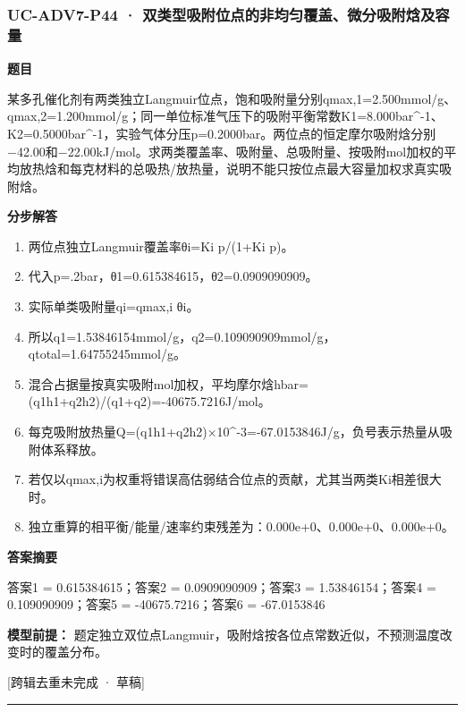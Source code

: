 \documentclass[UTF8,11pt,a4paper]{ctexart}
\begin{document}
\subsubsection*{UC-ADV7-P44 · 双类型吸附位点的非均匀覆盖、微分吸附焓及容量}
\noindent\textbf{题目}\par
某多孔催化剂有两类独立Langmuir位点，饱和吸附量分别qmax,1=2.500mmol/g、qmax,2=1.200mmol/g；同一单位标准气压下的吸附平衡常数K1=8.000bar\textasciicircum{}-1、K2=0.5000bar\textasciicircum{}-1，实验气体分压p=0.2000bar。两位点的恒定摩尔吸附焓分别−42.00和−22.00kJ/mol。求两类覆盖率、吸附量、总吸附量、按吸附mol加权的平均放热焓和每克材料的总吸热/放热量，说明不能只按位点最大容量加权求真实吸附焓。\par
\medskip\noindent\textbf{分步解答}
\begin{enumerate}
\item 两位点独立Langmuir覆盖率θi=Ki p/(1+Ki p)。
\item 代入p=.2bar，θ1=0.615384615，θ2=0.0909090909。
\item 实际单类吸附量qi=qmax,i θi。
\item 所以q1=1.53846154mmol/g，q2=0.109090909mmol/g，qtotal=1.64755245mmol/g。
\item 混合占据量按真实吸附mol加权，平均摩尔焓hbar=(q1h1+q2h2)/(q1+q2)=-40675.7216J/mol。
\item 每克吸附放热量Q=(q1h1+q2h2)×10\textasciicircum{}-3=-67.0153846J/g，负号表示热量从吸附体系释放。
\item 若仅以qmax,i为权重将错误高估弱结合位点的贡献，尤其当两类Ki相差很大时。
\item 独立重算的相平衡/能量/速率约束残差为：0.000e+0、0.000e+0、0.000e+0。
\end{enumerate}
\noindent\textbf{答案摘要}\par
答案1 = 0.615384615；答案2 = 0.0909090909；答案3 = 1.53846154；答案4 = 0.109090909；答案5 = -40675.7216；答案6 = -67.0153846\par
\noindent\textbf{模型前提：}
题定独立双位点Langmuir，吸附焓按各位点常数近似，不预测温度改变时的覆盖分布。\par
\noindent\textcolor{red!65!black}{[跨辑去重未完成 · 草稿]} \par
\medskip\hrule\medskip
{}
\end{document}
